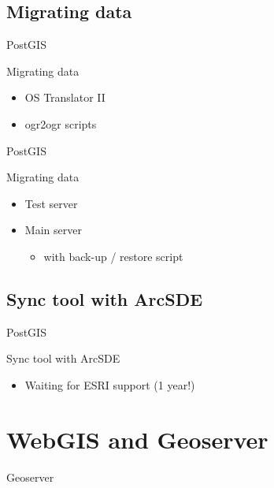 \subsection{Migrating data}

\begin{frame}{PostGIS}
	\begin{block}{Migrating data}
		\begin{itemize}
			\item OS Translator II
			\item ogr2ogr scripts
		\end{itemize}
	\end{block}	
\end{frame}

\begin{frame}{PostGIS}
	\begin{block}{Migrating data}
		\begin{itemize}
			\item Test server
			\item Main server
				\begin{itemize}
					\item with back-up / restore script
				\end{itemize}
		\end{itemize}
	\end{block}	
\end{frame}

\subsection{Sync tool with ArcSDE}

\begin{frame}{PostGIS}
	\begin{block}{Sync tool with ArcSDE}
		\begin{itemize}
			\item Waiting for ESRI support (1 year!)
		\end{itemize}
	\end{block}	
\end{frame}

\section{WebGIS and Geoserver}
\begin{frame}{Geoserver}
\end{frame}

